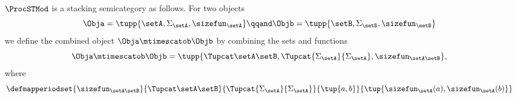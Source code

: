 \begin{lemma}
	$\ProcSTMod$ is a stacking semicategory as follows.
	For two objects
	\begin{equation}
		\Obja = \tupp{\setA, \Sigma_{\setA}, \sizefun_{\setA}}
		\qqand
		\Objb = \tupp{\setB, \Sigma_{\setB}, \sizefun_{\setB}}
	\end{equation}
	we define the combined object $\Obja \mtimescatob \Objb$ by combining the sets and functions
	\begin{equation}
		\Obja \mtimescatob \Objb = \tupp{
			\Tupcat \setA \setB,
			\Tupcat {\Sigma_{\setA}} {\Sigma_{\setA}},
			\sizefun_{\setA\setB}
		},
	\end{equation}
	where
	\begin{equation}
		\defmapperiodset{
			\sizefun_{\setA\setB}
		}{
			\Tupcat \setA \setB
		}{
			\Tupcat {\Sigma_{\setA}} {\Sigma_{\setA}}
		}{
			\tup{a,b}
		}{
			\tup{
				\sizefun_{\setA}(a),
				\sizefun_{\setA}(b)
			}
		}
	\end{equation}


\end{lemma}
